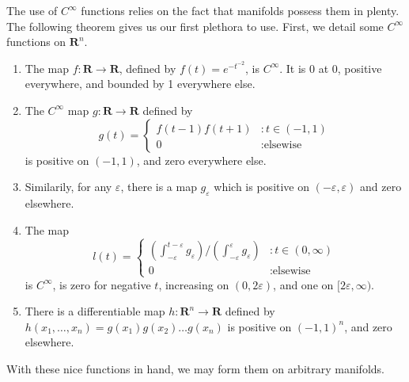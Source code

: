 \documentclass[12pt]{report}
\theoremstyle{plain}
\theoremstyle{definition}
\begin{document}
The use of $C^\infty$ functions relies on the fact that manifolds possess them in plenty. The following theorem gives us our first plethora to use. First, we detail some $C^\infty$ functions on $\mathbf{R}^n$.

\begin{enumerate}
    \item The map $f:\mathbf{R} \to \mathbf{R}$, defined by $f(t) = e^{-t^{-2}}$, is $C^\infty$. It is 0 at 0, positive everywhere, and bounded by 1 everywhere else.
    \item The $C^\infty$ map $g:\mathbf{R} \to \mathbf{R}$ defined by
    \[
    g(t) =
    \begin{cases} 
        f(t - 1)f(t + 1) & : t \in (-1, 1) \\
        0 & : \text{elsewise}
    \end{cases}
    \]
    is positive on $(-1,1)$, and zero everywhere else.
    \item Similarily, for any $\varepsilon$, there is a map $g_\varepsilon$ which is positive on $(-\varepsilon, \varepsilon)$ and zero elsewhere.
    \item The map 
    \[ l(t) = \begin{cases}
        \left(\int_{-\varepsilon}^{t - \varepsilon} g_\varepsilon \right)/\left(\int_{-\varepsilon}^\varepsilon g_\varepsilon \right) & : t \in (0, \infty) \\
        0 & : \text{elsewise}
    \end{cases} \]
    is $C^\infty$, is zero for negative $t$, increasing on $(0, 2\varepsilon)$, and one on $[2\varepsilon, \infty)$.
    \item There is a differentiable map $h:\mathbf{R}^n \to \mathbf{R}$ defined by $h(x_1, \dots, x_n) = g(x_1) g(x_2) \dots g(x_n)$ is positive on $(-1, 1)^n$, and zero elsewhere.
\end{enumerate}

With these nice functions in hand, we may form them on arbitrary manifolds.
\end{document}
